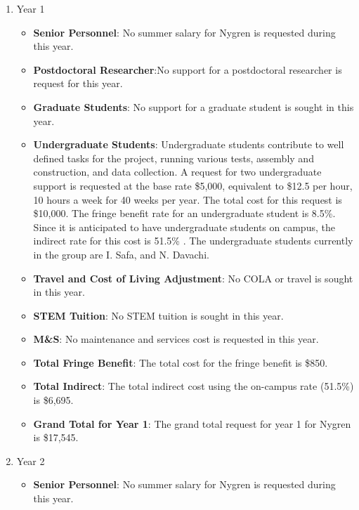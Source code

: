 \begin{enumerate}
\item{Year 1}
\begin{itemize}[noitemsep,nolistsep]
\item{{\bf Senior Personnel}: No summer salary for Nygren is requested during this year.}

\item {{\bf Postdoctoral Researcher}:No support for a postdoctoral researcher is request for this year.} 

\item{{\bf Graduate Students}: No support for a graduate student is sought in this year.}

\item {{\bf Undergraduate Students}: Undergraduate students contribute to well defined tasks for the project, running various tests, assembly and construction, and data collection.  A request for two undergraduate support is requested at the base rate \$5,000, equivalent to \$12.5 per hour, 10 hours a week for 40 weeks per year.  The total cost for this request is \$10,000.  The fringe benefit rate for an undergraduate student is 8.5\%.  Since it is anticipated to have undergraduate students on campus, the indirect rate for this cost is 51.5\% .  The undergraduate students currently in the group are I. Safa, and N. Davachi.}

\item{{\bf Travel and Cost of Living Adjustment}: No COLA or travel is sought in this year.}

\item {{\bf STEM Tuition}: No STEM tuition is sought in this year.}

\item {{\bf M\&S}: No maintenance and services cost is requested in this year.}

\item {{\bf Total Fringe Benefit}: The total cost for the fringe benefit is \$850.}

\item {{\bf Total Indirect}: The total indirect cost using the on-campus rate (51.5\%) is \$6,695.}

\item {{\bf Grand Total for Year 1}: The grand total request for year 1 for Nygren is \$17,545.}

\end{itemize}

\item{Year 2}
\begin{itemize}[noitemsep,nolistsep]
\item{{\bf Senior Personnel}: No summer salary for Nygren is requested during this year.}


\end{itemize}
\end{enumerate}
